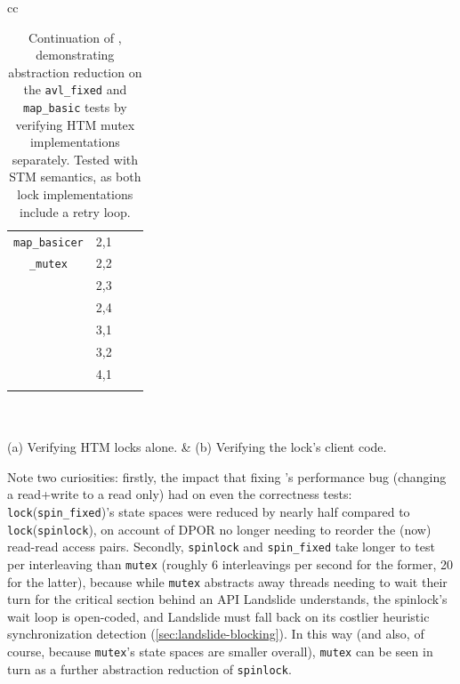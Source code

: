 \begin{table}[t]
\begin{center}
\begin{tabular}{cc}
\begin{tabular}{cc||r|r}
			{\tt map\_basicer}
			& 2,1 & \cpu{14.34} & \ints{9} \\
			{\tt \_mutex}
			& 2,2 & \cpu{147.27} & \ints{2953} \\
			& 2,3 & \cpu{12946.21} & \ints{244691} \\
			& 2,4 & \ETAdag{qqq} & \ETAdag{qqq} \\
			& 3,1 & \cpu{637.81} & \ints{12707} \\
			& 3,2 & \ETAdag{102d 13h} & \ETAdag{13220616} \\
			& 4,1 & \ETAdag{33h 33m} & \ETAdag{1778661} \\
			\\
		\end{tabular}
		\\
		\\
		(a) Verifying HTM locks alone.
		&
		(b) Verifying the lock's client code.
		\end{tabular}
	\end{center}
	\caption[Continuation of , demonstrating abstraction reduction.]
		{Continuation of ,
		demonstrating abstraction reduction %
		on the {\tt avl\_fixed} and {\tt map\_basic} tests
		by verifying HTM mutex implementations separately.
		Tested with STM semantics, as both lock implementations include a retry loop.}
	\label{tab:tm-verifs2}
\end{table}

Note two curiosities:
firstly,
the impact that fixing 's performance bug
(changing a read+write to a read only)
had on even the correctness tests:
{\tt lock}({\tt spin\_fixed})'s state spaces were reduced by nearly half compared to {\tt lock}({\tt spinlock}),
on account of DPOR no longer needing to reorder the (now) read-read access pairs.
Secondly, {\tt spinlock} and {\tt spin\_fixed} take longer to test per interleaving
than {\tt mutex}
(roughly 6 interleavings per second for the former, 20 for the latter),
because while {\tt mutex} abstracts away threads needing to wait their turn for the critical section
behind an API Landslide understands,
the spinlock's wait loop is open-coded, and Landslide must fall back on its costlier heuristic synchronization detection
(\cref{sec:landslide-blocking}).
In this way (and also, of course, because {\tt mutex}'s state spaces are smaller overall),
{\tt mutex} can be seen in turn as a further abstraction reduction of {\tt spinlock}.

